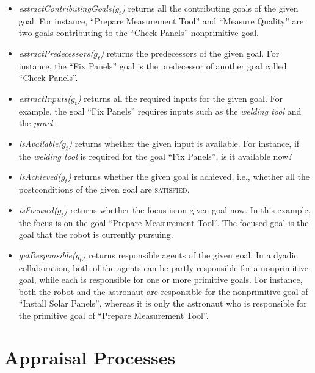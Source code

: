 \documentclass{article}
\begin{document}
\begin{itemize}[leftmargin=2pt]
  \item \textit{extractContributingGoals($g_t$)} returns all the contributing
  goals of the given goal. For instance, ``Prepare Measurement Tool'' and
  ``Measure Quality'' are two goals contributing to the ``Check Panels''
  nonprimitive goal.
  
  \item \textit{extractPredecessors($g_t$)} returns the predecessors of the
  given goal. For instance, the ``Fix Panels'' goal is the predecessor of
  another goal called ``Check Panels''.
  
  \item \textit{extractInputs($g_t$)} returns all the required inputs for
  the given goal. For example, the goal ``Fix Panels'' requires inputs such as
  the \textit{welding tool} and the \textit{panel}.
  
  \item \textit{isAvailable($g_t$)} returns whether the given input is
  available. For instance, if the \textit{welding tool} is required for the goal
  ``Fix Panels'', is it available now?
  
  \item \textit{isAchieved($g_t$)} returns whether the given goal is achieved,
  i.e., whether all the postconditions of the given goal are \textsc{satisfied}.
  
  \item \textit{isFocused($g_t$)} returns whether the focus is on given
  goal now. In this example, the focus is on the goal ``Prepare Measurement
  Tool''. The focused goal is the goal that the robot is currently pursuing.
  
  \item \textit{getResponsible($g_t$)} returns responsible agents of the given
  goal. In a dyadic collaboration, both of the agents can be partly responsible
  for a nonprimitive goal, while each is responsible for one or more primitive
  goals. For instance, both the robot and the astronaut are responsible for the
  nonprimitive goal of ``Install Solar Panels'', whereas it is only the
  astronaut who is responsible for the primitive goal of ``Prepare Measurement
  Tool''.
\end{itemize}

\section{Appraisal Processes}
\label{sec:appraisal-process}
\end{document}
